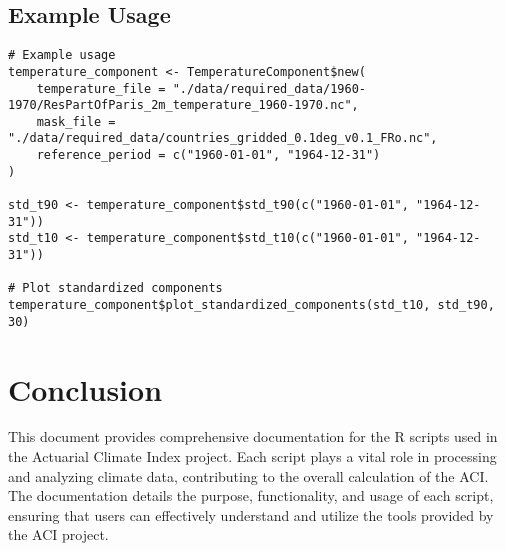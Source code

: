 \documentclass[a4paper,12pt]{article}
\begin{document}
\subsection{Example Usage}

\begin{verbatim}
# Example usage
temperature_component <- TemperatureComponent$new(
    temperature_file = "./data/required_data/1960-1970/ResPartOfParis_2m_temperature_1960-1970.nc",
    mask_file = "./data/required_data/countries_gridded_0.1deg_v0.1_FRo.nc",
    reference_period = c("1960-01-01", "1964-12-31")
)

std_t90 <- temperature_component$std_t90(c("1960-01-01", "1964-12-31"))
std_t10 <- temperature_component$std_t10(c("1960-01-01", "1964-12-31"))

# Plot standardized components
temperature_component$plot_standardized_components(std_t10, std_t90, 30)
\end{verbatim}

\section{Conclusion}
This document provides comprehensive documentation for the R scripts used in the Actuarial Climate Index project. Each script plays a vital role in processing and analyzing climate data, contributing to the overall calculation of the ACI. The documentation details the purpose, functionality, and usage of each script, ensuring that users can effectively understand and utilize the tools provided by the ACI project.
\end{document}
